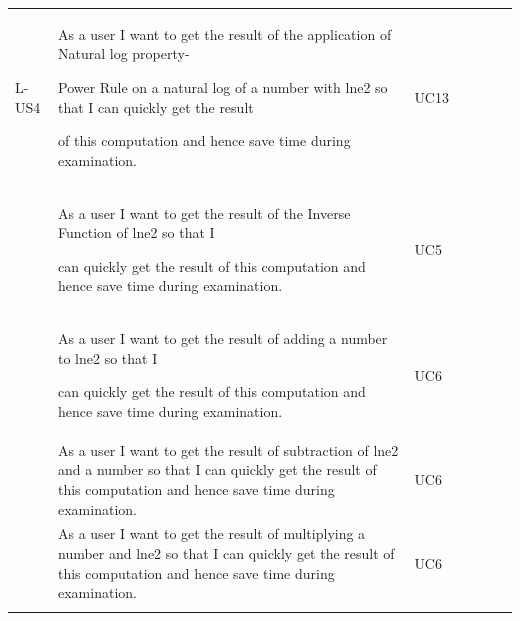 \documentclass[12pt]{article}
\begin{document}
{\begin{longtable}{p{0.56in}p{0.65in}p{1.19in}p{0.53in}p{0.46in}p{0.64in}p{0.99in}}
\multicolumn{1}{|p{0.65in}}{L-US4} & 
\multicolumn{1}{|p{1.19in}}{As a user I want to get the result of the application of Natural log property- \par Power Rule on a natural log of a number with lne2 so that I can quickly get the result \par of this computation and hence save time during examination.} & 
\multicolumn{1}{|p{0.53in}}{UC13} & 
\multicolumn{1}{|p{0.46in}}{} & 
\multicolumn{1}{|p{0.64in}}{} & 
\multicolumn{1}{|p{0.99in}|}{} \\
\hhline{-------}

\multicolumn{1}{|p{0.65in}}{L-US5} & 
\multicolumn{1}{|p{1.19in}}{As a user I want to get the result of the Inverse Function of lne2 so that I \par can quickly get the result of this computation and hence save time during examination.} & 
\multicolumn{1}{|p{0.53in}}{UC5} & 
\multicolumn{1}{|p{0.46in}}{} & 
\multicolumn{1}{|p{0.64in}}{} & 
\multicolumn{1}{|p{0.99in}|}{} \\
\hhline{-------}

\multicolumn{1}{|p{0.65in}}{L-US6} & 
\multicolumn{1}{|p{1.19in}}{As a user I want to get the result of adding a number to lne2 so that I \par can quickly get the result of this computation and hence save time during examination.} & 
\multicolumn{1}{|p{0.53in}}{UC6} & 
\multicolumn{1}{|p{0.46in}}{} & 
\multicolumn{1}{|p{0.64in}}{} & 
\multicolumn{1}{|p{0.99in}|}{} \\
\hhline{-------}

\multicolumn{1}{|p{0.65in}}{L-US7} & 
\multicolumn{1}{|p{1.19in}}{As a user I want to get the result of subtraction of lne2 and a number
so that I can quickly get the result of this computation and hence save time during
examination.} & 
\multicolumn{1}{|p{0.53in}}{UC6} & 
\multicolumn{1}{|p{0.46in}}{} & 
\multicolumn{1}{|p{0.64in}}{} & 
\multicolumn{1}{|p{0.99in}|}{} \\
\hhline{-------}

\multicolumn{1}{|p{0.65in}}{L-US8} & 
\multicolumn{1}{|p{1.19in}}{As a user I want to get the result of multiplying a number and lne2 so that
I can quickly get the result of this computation and hence save time during examination.} & 
\multicolumn{1}{|p{0.53in}}{UC6} & 
\multicolumn{1}{|p{0.46in}}{} & 
\multicolumn{1}{|p{0.64in}}{} & 
\multicolumn{1}{|p{0.99in}|}{} \\
\hhline{-------}


\end{longtable}}
\end{document}

